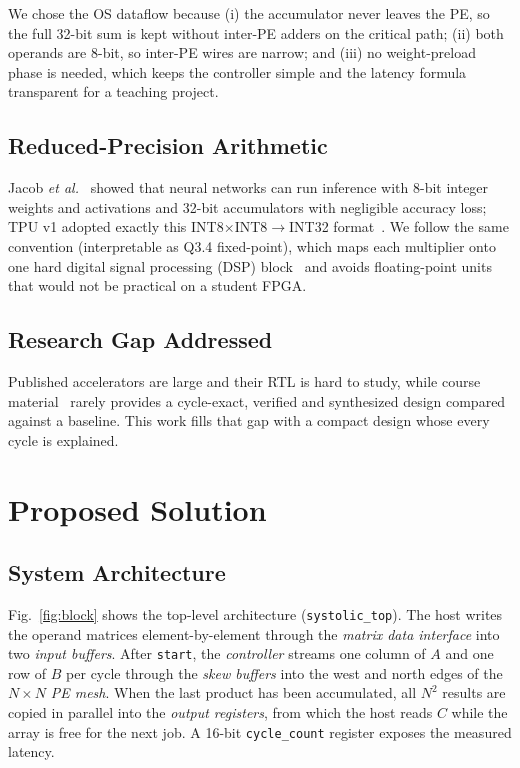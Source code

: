 \documentclass[conference]{IEEEtran}
\begin{document}
We chose the OS dataflow because (i) the accumulator never leaves the PE, so
the full 32-bit sum is kept without inter-PE adders on the critical path;
(ii) both operands are 8-bit, so inter-PE wires are narrow; and (iii) no
weight-preload phase is needed, which keeps the controller simple and the
latency formula transparent for a teaching project.

\subsection{Reduced-Precision Arithmetic}
Jacob \emph{et al.}~\cite{jacob2018quantization} showed that neural networks
can run inference with 8-bit integer weights and activations and 32-bit
accumulators with negligible accuracy loss; TPU v1 adopted exactly this
INT8$\times$INT8$\rightarrow$INT32 format~\cite{jouppi2017tpu}. We follow the
same convention (interpretable as Q3.4 fixed-point), which maps each multiplier
onto one hard digital signal processing (DSP) block~\cite{xilinx2018dsp48} and avoids floating-point
units that would not be practical on a student FPGA.

\subsection{Research Gap Addressed}
Published accelerators are large and their RTL is hard to study, while
course material~\cite{patterson2020cod,hennessy2019ca} rarely provides a
cycle-exact, verified and synthesized design compared against a baseline.
This work fills that gap with a compact design whose every cycle is explained.

\section{Proposed Solution}

\subsection{System Architecture}
Fig.~\ref{fig:block} shows the top-level architecture (\texttt{systolic\_top}).
The host writes the operand matrices element-by-element through the
\emph{matrix data interface} into two \emph{input buffers}. After
\texttt{start}, the \emph{controller} streams one column of $A$ and one row of
$B$ per cycle through the \emph{skew buffers} into the west and north edges of
the $N\times N$ \emph{PE mesh}. When the last product has been accumulated, all
$N^2$ results are copied in parallel into the \emph{output registers}, from
which the host reads $C$ while the array is free for the next job. A
16-bit \texttt{cycle\_count} register exposes the measured latency.
\end{document}
